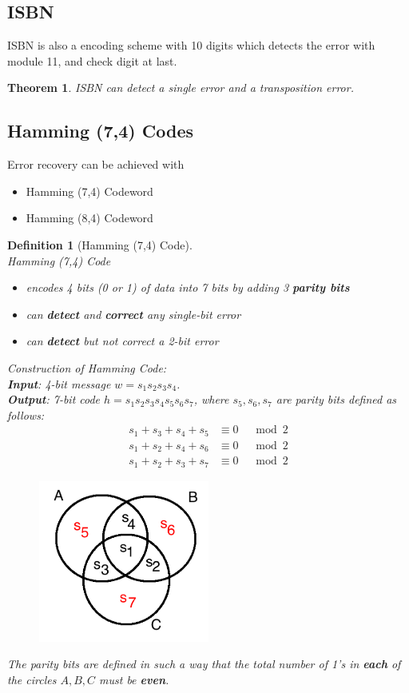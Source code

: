 \documentclass[12pt]{article}
\newtheorem{definition}{Definition}[section]
\newtheorem{theorem}{Theorem}[section]
\theoremstyle{definition}
\begin{document}
\subsection{ISBN}
ISBN is also a encoding scheme with 10 digits which detects the error with module 11, and check digit at last.
\begin{theorem} \normalfont ISBN can detect a single error and a transposition error.\end{theorem}
\subsection{Hamming (7,4) Codes}
Error recovery can be achieved with 
\begin{itemize}
  \item Hamming (7,4) Codeword
  \item Hamming (8,4) Codeword
\end{itemize}
\begin{definition}[Hamming (7,4) Code]
\hfill\\\normalfont Hamming (7,4) Code 
\begin{itemize}
  \item encodes 4 bits (0 or 1) of data into 7 bits by adding 3 \textbf{parity bits}
  \item can \textbf{detect} and \textbf{correct} any single-bit error
  \item can \textbf{detect} but \textit{not} correct a 2-bit error
\end{itemize}
Construction of Hamming Code:\\
\textbf{Input}: 4-bit message $w=s_1s_2s_3s_4$.\\
\textbf{Output}: 7-bit code $h=s_1s_2s_3s_4s_5s_6s_7$, where $s_5,s_6,s_7$ are parity bits defined as follows:
\begin{align*}
s_1+s_3+s_4+s_5&\equiv 0\;\;\;\mod 2\\
s_1+s_2+s_4+s_6&\equiv 0\;\;\;\mod 2\\
s_1+s_2+s_3+s_7&\equiv 0\;\;\;\mod 2
\end{align*}
\begin{figure}[h]
\centering
\includegraphics[width = 0.5\textwidth]{4_1.png}
\end{figure}
The parity bits are defined in such a way that the total number of 1's in \textbf{each} of the circles $A,B,C$ must be \textbf{even}.
\end{definition}
\end{document}
